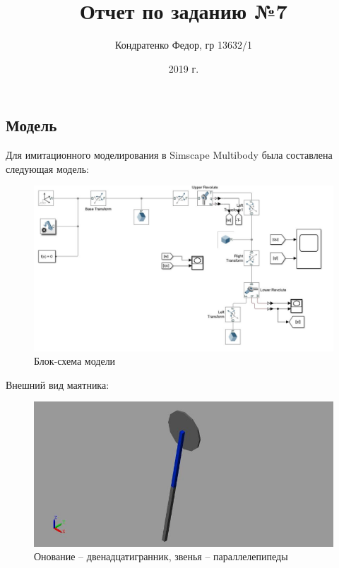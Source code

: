 \documentclass{article}
\date{2019 г.}
\author{Кондратенко Федор, гр 13632/1}
\title{Отчет по заданию №7}
\begin{document}
	\maketitle
	\subsection*{Модель}
	Для имитационного моделирования в Simscape Multibody была составлена следующая модель:
	\begin{figure}[H]
		\centering
		\includegraphics[width=0.7\linewidth]{model}
		\caption{Блок-схема модели}
		\label{fig:model}
	\end{figure}
	Внешний вид маятника:
	\begin{figure}[H]
		\centering
		\includegraphics[width=0.7\linewidth]{3d}
		\caption{Онование -- двенадцатигранник, звенья -- параллелепипеды}
		\label{fig:3d}
	\end{figure}
\end{document}
